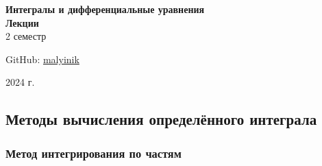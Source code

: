



\begin{titlepage}
    \vspace*{0pt}
    \vfill
    \centering
    \Huge\textbf{Интегралы и дифференциальные уравнения} \\[7pt]
    \Large\textbf{Лекции} \\
    \large 2 семестр \\ 
    \vfill
    \begin{flushright}
        \normalsize GitHub: \href{https://github.com/malyinik}{malyinik} \\
    \end{flushright}
    \normalsize 2024 г.
\end{titlepage}
\newpage

\tableofcontents
\newpage

\newpage
\zerocounter

\zerocounter
\newpage

\zerocounter
\newpage



\zerocounter
\subsection{Методы вычисления определённого интеграла}

\subsubsection{Метод интегрирования по частям}


